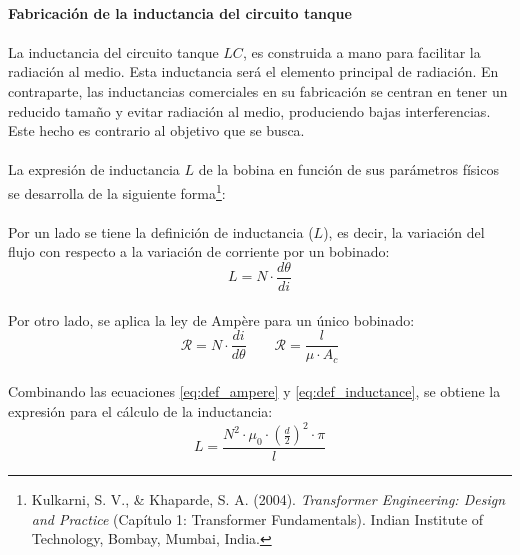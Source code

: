 \paragraph{Fabricaci\'on de la inductancia del circuito tanque}
\paragraph{}
La inductancia del circuito tanque $LC$, es construida a mano para facilitar la radiación al medio. Esta inductancia será el elemento principal de radiación.
En contraparte, las inductancias comerciales en su fabricación se centran en tener un reducido tamaño y evitar radiación al medio, produciendo bajas interferencias. Este hecho es contrario al objetivo que se busca.
\paragraph{}
La expresión de inductancia $L$ de la bobina en función de sus parámetros físicos se desarrolla de la siguiente forma\footnote{Kulkarni, S. V., \& Khaparde, S. A. (2004). \textit{Transformer Engineering: Design and Practice} (Capítulo 1: Transformer Fundamentals). Indian Institute of Technology, Bombay, Mumbai, India.}:
\paragraph{}
Por un lado se tiene la definici\'on de inductancia ($L$), es decir, la variación del flujo con respecto a la variación de corriente por un bobinado: 
\begin{equation}
   \label{eq:def_inductance}
   L = N \cdot \frac{d\theta}{di}
\end{equation}
\paragraph{}
Por otro lado, se aplica la ley de Amp\`ere para un único bobinado:
\begin{equation}
   \label{eq:def_ampere}
   \mathcal{R} = N \cdot \frac{di}{d\theta} \quad \quad
   \mathcal{R} = \frac{l}{\mu \cdot A_c}
\end{equation}
\paragraph{}
Combinando las ecuaciones \ref{eq:def_ampere} y \ref{eq:def_inductance}, se obtiene la expresi\'on para el c\'alculo de la inductancia:
\begin{equation}
   \label{eq:def_inductance2}
   L = \frac{N^2 \cdot \mu_0 \cdot \left(\frac{d}{2} \right)^2 \cdot \pi}{l}
\end{equation}
